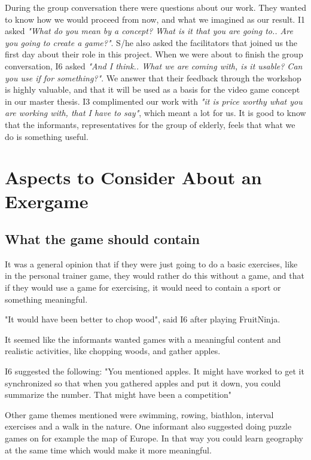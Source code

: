 During the group conversation there were questions about our work. They wanted to know how we would proceed from now, and what we imagined as our result. I1 asked \emph{"What do you mean by a concept? What is it that you are going to.. Are you going to create a game?"}. S/he also asked the facilitators that joined us the first day about their role in this project. When we were about to finish the group conversation, I6 asked \emph{"And I think.. What we are coming with, is it usable? Can you use if for something?"}. We answer that their feedback through the workshop is highly valuable, and that it will be used as a basis for the video game concept in our master thesis. I3 complimented our work with \emph{"it is price worthy what you are working with, that I have to say"}, which meant a lot for us. It is good to know that the informants, representatives for the group of elderly, feels that what we do is something useful.  

\section{Aspects to Consider About an Exergame}
\subsection{What the game should contain}

It was a general opinion that if they were just going to do a basic exercises, like in the personal trainer game, they would rather do this without a game, and that if they would use a game for exercising, it would need to contain a sport or something meaningful. 

"It would have been better to chop wood", said I6 after playing FruitNinja. 

It seemed like the informants wanted games with a meaningful content and realistic activities, like chopping woods, and gather apples. 

I6 suggested the following: "You mentioned apples. It might have worked to get it synchronized so that when you gathered apples and put it down, you could summarize the number. That might have been a competition" 

Other game themes mentioned were swimming, rowing, biathlon, interval exercises and a walk in the nature. One informant also suggested doing puzzle games on for example the map of Europe. In that way you could learn geography at the same time which would make it more meaningful.

